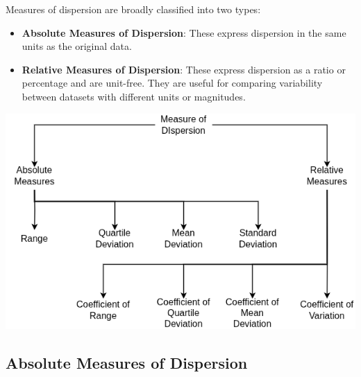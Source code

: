 \documentclass[twoside]{book}
\begin{document}
Measures of dispersion are broadly classified into two types:
\begin{itemize}
    \item \textbf{Absolute Measures of Dispersion}: These express dispersion in the same units as the original data.
    \item \textbf{Relative Measures of Dispersion}: These express dispersion as a ratio or percentage and are unit-free. They are useful for comparing variability between datasets with different units or magnitudes.
\end{itemize}

\begin{center}
    \includegraphics[scale=0.5]{pic/mod.drawio.png}
\end{center}

\subsection{Absolute Measures of Dispersion}
\end{document}
